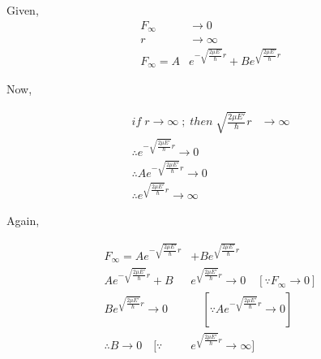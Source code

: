 \documentclass{article}
\begin{document}
\large{
Given,
\begin{equation*}
\begin{aligned}
F_\infty	& \rightarrow 0 \\
r			& \rightarrow \infty \\
F_\infty = A & e^{-\sqrt{\frac{2\mu E'}{\hbar}}r}  + B e^{\sqrt{\frac{2\mu E'}{\hbar}}r}
\end{aligned}
\end{equation*}

Now,

\begin{equation*}
\begin{aligned}
if\;r\rightarrow\infty \; ; \; then\;\sqrt{\frac{2\mu E'}{\hbar}}r&\rightarrow\infty \\
\therefore e^{-\sqrt{\frac{2\mu E'}{\hbar}}r} \rightarrow 0 \\
\therefore Ae^{-\sqrt{\frac{2\mu E'}{\hbar}}r} \rightarrow 0 \\
\therefore e^{\sqrt{\frac{2\mu E'}{\hbar}}r} \rightarrow \infty
\end{aligned}
\end{equation*}

Again,

\begin{equation*}
\begin{aligned}
F_\infty = A e^{-\sqrt{\frac{2\mu E'}{\hbar}}r} & + B e^{\sqrt{\frac{2\mu E'}{\hbar}}r} \\
A e^{-\sqrt{\frac{2\mu E'}{\hbar}}r} + B & e^{\sqrt{\frac{2\mu E'}{\hbar}}r} \rightarrow 0 \quad [\because F_\infty \rightarrow 0] \\
B e^{\sqrt{\frac{2\mu E'}{\hbar}}r} \rightarrow 0 & \quad [\because Ae^{-\sqrt{\frac{2\mu E'}{\hbar}}r} \rightarrow 0] \\
\therefore B \rightarrow 0 \quad [\because & e^{\sqrt{\frac{2\mu E'}{\hbar}}r} \rightarrow \infty]
\end{aligned}
\end{equation*}
}



\newpage
\subsection{}%
\end{document}
